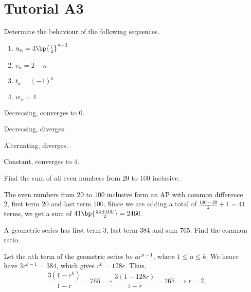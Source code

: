 \section{Tutorial A3}

\begin{problem}
    Determine the behaviour of the following sequences.

    \begin{enumerate}
        \item $u_n = 3\bp{\frac12}^{n-1}$
        \item $v_n = 2 - n$
        \item $t_n = (-1)^n$
        \item $w_n = 4$
    \end{enumerate}
\end{problem}
\begin{solution}
    \begin{ppart}
        Decreasing, converges to 0.
    \end{ppart}
    \begin{ppart}
        Decreasing, diverges.
    \end{ppart}
    \begin{ppart}
        Alternating, diverges.
    \end{ppart}
    \begin{ppart}
        Constant, converges to 4.
    \end{ppart}
\end{solution}

\begin{problem}
    Find the sum of all even numbers from 20 to 100 inclusive.
\end{problem}
\begin{solution}
    The even numbers from 20 to 100 inclusive form an AP with common difference 2, first term 20 and last term 100. Since we are adding a total of $\frac{100-20}{2} + 1 = 41$ terms, we get a sum of $41\bp{\frac{20 + 100}{2}} = 2460$.
\end{solution}

\begin{problem}
    A geometric series has first term 3, last term 384 and sum 765. Find the common ratio.
\end{problem}
\begin{solution}
    Let the $n$th term of the geometric series be $ar^{n-1}$, where $1 \leq n \leq k$. We hence have $3r^{k-1} = 384$, which gives $r^k = 128r$. Thus, \[\frac{3(1-r^k)}{1-r} = 765 \implies \frac{3(1-128r)}{1-r} = 765 \implies r = 2.\]
\end{solution}

